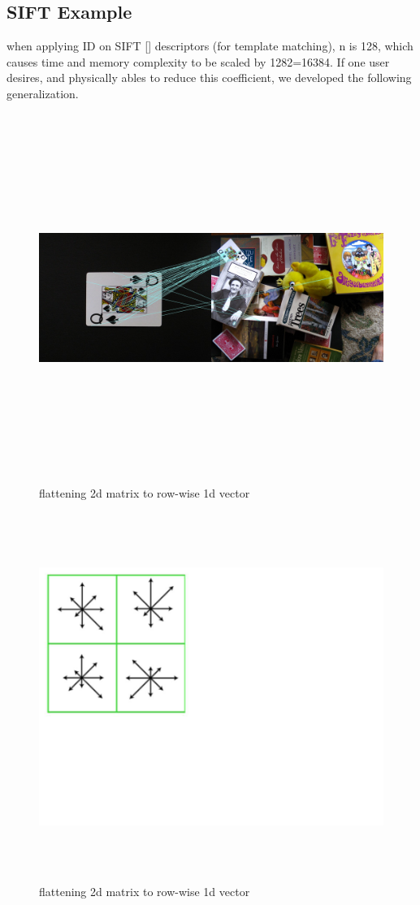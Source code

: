 \subsection{SIFT Example}

when applying ID on SIFT [] descriptors (for template matching),  n is 128, which causes time and memory complexity to be scaled by 1282=16384. 
If one user desires, and physically ables to reduce this coefficient, we developed the following generalization.

\begin{figure} \label{s1}
	    \centering
		\includegraphics[width=\linewidth,height=12cm,keepaspectratio]{Figures/sift1}
		\caption[flattening 2d matrix]
		{flattening 2d matrix to row-wise 1d vector}
	
\end{figure}
	
	
	
\begin{figure} \label{s2}
		\centering
	
		\includegraphics[width=12cm,height=12cm,keepaspectratio]{Figures/sift2}
		\caption[flattening 2d matrix]
		{flattening 2d matrix to row-wise 1d vector}
	
\end{figure}

